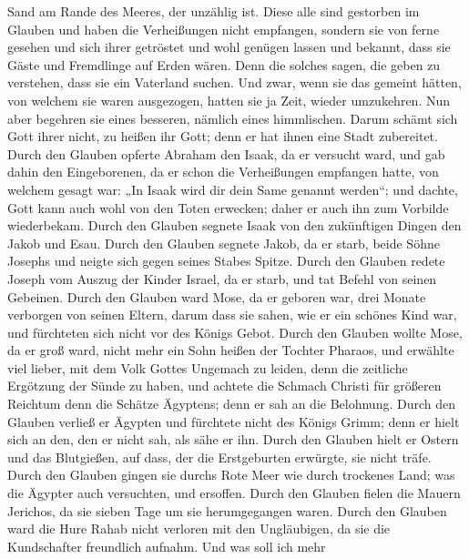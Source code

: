 Sand am Rande des Meeres, der unzählig ist.  Diese alle
sind gestorben im Glauben und haben die Verheißungen nicht empfangen,
sondern sie von ferne gesehen und sich ihrer getröstet und wohl genügen
lassen und bekannt, dass sie Gäste und Fremdlinge auf Erden wären.
 Denn die solches sagen, die geben zu verstehen, dass sie
ein Vaterland suchen.  Und zwar, wenn sie das gemeint
hätten, von welchem sie waren ausgezogen, hatten sie ja Zeit, wieder
umzukehren.  Nun aber begehren sie eines besseren, nämlich
eines himmlischen. Darum schämt sich Gott ihrer nicht, zu heißen ihr
Gott; denn er hat ihnen eine Stadt zubereitet.  Durch den
Glauben opferte Abraham den Isaak, da er versucht ward, und gab dahin
den Eingeborenen, da er schon die Verheißungen empfangen hatte,
 von welchem gesagt war: „In Isaak wird dir dein Same
genannt werden``;  und dachte, Gott kann auch wohl von den
Toten erwecken; daher er auch ihn zum Vorbilde wiederbekam.
 Durch den Glauben segnete Isaak von den zukünftigen Dingen
den Jakob und Esau.  Durch den Glauben segnete Jakob, da er
starb, beide Söhne Josephs und neigte sich gegen seines Stabes Spitze.
 Durch den Glauben redete Joseph vom Auszug der Kinder
Israel, da er starb, und tat Befehl von seinen Gebeinen. 
Durch den Glauben ward Mose, da er geboren war, drei Monate verborgen
von seinen Eltern, darum dass sie sahen, wie er ein schönes Kind war,
und fürchteten sich nicht vor des Königs Gebot.  Durch den
Glauben wollte Mose, da er groß ward, nicht mehr ein Sohn heißen der
Tochter Pharaos,  und erwählte viel lieber, mit dem Volk
Gottes Ungemach zu leiden, denn die zeitliche Ergötzung der Sünde zu
haben,  und achtete die Schmach Christi für größeren
Reichtum denn die Schätze Ägyptens; denn er sah an die Belohnung.
 Durch den Glauben verließ er Ägypten und fürchtete nicht
des Königs Grimm; denn er hielt sich an den, den er nicht sah, als sähe
er ihn.  Durch den Glauben hielt er Ostern und das
Blutgießen, auf dass, der die Erstgeburten erwürgte, sie nicht träfe.
 Durch den Glauben gingen sie durchs Rote Meer wie durch
trockenes Land; was die Ägypter auch versuchten, und ersoffen.
 Durch den Glauben fielen die Mauern Jerichos, da sie
sieben Tage um sie herumgegangen waren.  Durch den Glauben
ward die Hure Rahab nicht verloren mit den Ungläubigen, da sie die
Kundschafter freundlich aufnahm.  Und was soll ich mehr
